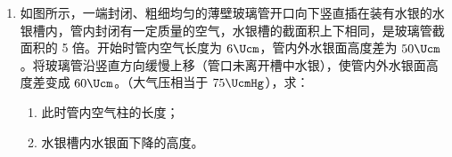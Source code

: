 \documentclass[\gkver]{gaokaozhenti}
\begin{document}
\begin{enumerate}
某同学求解如下：

根据电荷守恒定律：$q_{1}+q_{2}=3\times10^{-8}\UC=a$　　（1）

根据库仑定律：$q_{1}q_{2}=\frac{Fr^{2}}{k}=\frac{9\times10^{-4}\times(10\times10^{-2})^{2}}{9\times10^{9}}\UC^{2}=1\times10^{-15}\UC^{2}=b$

以 $q_{2}=\frac{b}{q_{1}}$ 代入（1）式得：$q_{1}^{2}-aq_{1}-b=0$

解得 $q_{1}=\frac{1}{2}\left(a\pm\sqrt{a^{2}-4b}\right)=\frac{1}{2}\left(3\times10^{-8}\pm\sqrt{9\times10^{-16}-4\times10^{-15}}\right)\UC$

根号中的数值小于 $0$，经检查，运算无误。试指出求解过程中的问题并给出正确的解答。



\item
如图所示，一端封闭、粗细均匀的薄壁玻璃管开口向下竖直插在装有水银的水银槽内，管内封闭有一定质量的空气，水银槽的截面积上下相同，是玻璃管截面积的 5 倍。开始时管内空气长度为 $6\Ucm$，管内外水银面高度差为 $50\Ucm$。将玻璃管沿竖直方向缓慢上移（管口未离开槽中水银），使管内外水银面高度差变成 $60\Ucm$。（大气压相当于 $75\UcmHg$），求：
\begin{enumerate}
	\item
	此时管内空气柱的长度；
	\item
	水银槽内水银面下降的高度。
\end{enumerate}
\onepicture[align=right, h=3.21cm]{}



\end{enumerate}
\end{document}
